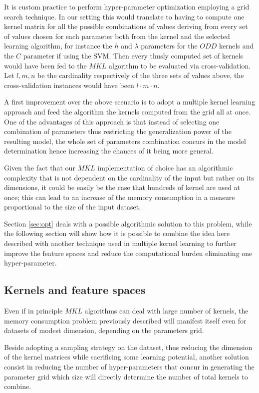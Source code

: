 It is custom practice to perform hyper-parameter optimization employing a grid
search technique.
In our setting this would translate to having to compute one kernel matrix
for all the possible combinations of values deriving from every set of values
chosen for each parameter both from the kernel and the selected learning
algorithm, for instance the $h$ and $\lambda$ parameters for the $ODD$ kernels
and the $C$ parameter if using the SVM.
Then every thusly computed set of kernels would have been fed to the $MKL$
algorithm to be evaluated via cross-validation.
Let $l,m,n$ be the cardinality respectively of the three sets of values above,
the cross-validation instances would have been $l\cdot m\cdot n$.

A first improvement over the above scenario is to adopt a multiple kernel learning
approach and feed the algorithm the kernels computed from the grid all at once.
One of the advantages of this approach is that instead of selecting one combination
of parameters thus restricting the generalization power of the resulting model,
the whole set of parameters combination concurs in the model determination hence
increasing the chances of it being more general.

Given the fact that our $MKL$ implementation of choice has an algorithmic
complexity that is not dependent on the cardinality of the input but rather on
its dimensions, it could be easily be the case that hundreds of kernel are used
at once; this can lead to an increase of the memory consumption in a measure
proportional to the size of the input dataset.

Section \ref{sec:opt} deals with a possible algorithmic solution to this problem,
while the following section will show how it is possible to combine the idea here
described with another technique used in multiple kernel learning to further
improve the feature spaces and reduce the computational burden eliminating
one hyper-parameter.

\subsection{Kernels and feature spaces}
\label{subsec:features}

Even if in principle $MKL$ algorithms can deal with large number of kernels, the
memory consumption problem previously described will manifest itself even for
datasets of modest dimension, depending on the parameters grid.

Beside adopting a sampling strategy on the dataset, thus reducing the dimension
of the kernel matrices while sacrificing some learning potential, another
solution consist in reducing the number of hyper-parameters that concur
in generating the parameter grid which size will directly determine the number
of total kernels to combine.

